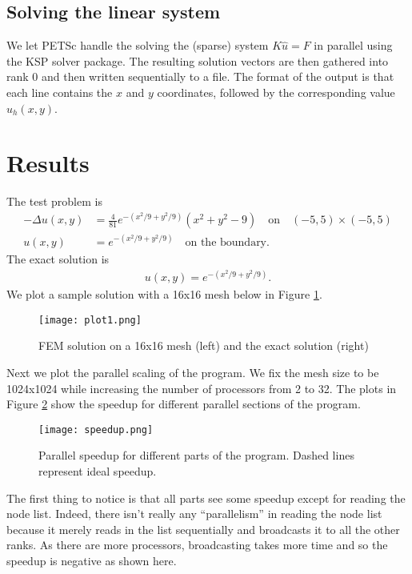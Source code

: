 \documentclass[12pt,notitlepage]{extreport}
\begin{document}
\subsection*{Solving the linear system}
We let PETSc handle the solving the (sparse) system $K\hat{u} = F$ in parallel using the KSP solver package. The resulting solution vectors are then gathered into rank 0 and then written sequentially to a file. The format of the output is that each line contains the $x$ and $y$ coordinates, followed by the corresponding value $u_h(x,y)$.

\section*{Results}
The test problem is
\begin{align}
  -\Delta u(x,y) &= \frac{4}{81}e^{-(x^2/9+y^2/9)}(x^2 + y^2 - 9) \quad \text{on} \quad (-5,5) \times (-5,5) \\
  u(x,y) &= e^{-(x^2/9 + y^2/9)} \quad \text{on the boundary}.
\end{align}
The exact solution is
\begin{align}
  u(x,y) = e^{-(x^2/9 + y^2/9)}.
\end{align}
We plot a sample solution with a  16x16 mesh below in Figure \ref{fig:plot}.

\begin{figure}[h]
  \centering
  \texttt{[image: plot1.png]}

  \caption{FEM solution on a 16x16 mesh (left) and the exact solution (right)}
  \label{fig:plot}
\end{figure}
Next we plot the parallel scaling of the program. We fix the mesh size to be 1024x1024 while increasing the number of processors from 2 to 32. The plots in Figure \ref{fig:speedup} show the speedup for different parallel sections of the program.
\begin{figure}[h]
  \centering
  \texttt{[image: speedup.png]}

  \caption{Parallel speedup for different parts of the program. Dashed lines represent ideal speedup.}
  \label{fig:speedup}
\end{figure}

The first thing to notice is that all parts see some speedup except for reading the node list. Indeed, there isn't really any ``parallelism'' in reading the node list because it merely reads in the list sequentially and broadcasts it to all the other ranks. As there are more processors, broadcasting takes more time and so the speedup is negative as shown here.
\end{document}

